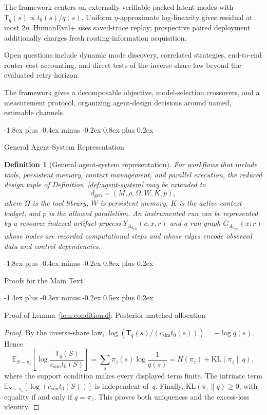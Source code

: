 \documentclass[10pt,twocolumn]{article}
\makeatletter
\theoremstyle{paperplain}
\theoremstyle{paperdefinition}
\newtheorem{definition}[theorem]{Definition}
\theoremstyle{paperremark}
\renewcommand{\section}{%
  \@startsection{section}{1}{\z@}%
    {-1.8ex plus -0.4ex minus -0.2ex}%
    {0.8ex plus 0.2ex}%
    {\normalfont\large\bfseries\raggedright}}
\renewcommand{\subsection}{%
  \@startsection{subsection}{2}{\z@}%
    {-1.4ex plus -0.3ex minus -0.2ex}%
    {0.5ex plus 0.2ex}%
    {\normalfont\normalsize\bfseries\raggedright}}
\newcommand{\KL}{\mathrm{KL}}
\newcommand{\E}{\mathbb{E}}
\makeatother
\begin{document}
The framework centers on externally verifiable packed latent modes with
$\mathsf{T}_q(s)\propto t_0(s)/q(s)$.  Uniform $\eta$-approximate
log-linearity gives residual at most $2\eta$.  HumanEval+ uses saved-trace
replay; prospective paired deployment additionally charges fresh
routing-information acquisition.

Open questions include dynamic mode discovery, correlated strategies,
end-to-end router-cost accounting, and direct tests of the inverse-share law
beyond the evaluated retry horizon.

The framework gives a decomposable objective, model-selection crossovers, and a
measurement protocol, organizing agent-design decisions around named,
estimable channels.

\onecolumn
\appendix

\section{General Agent-System Representation}
\label{app:general-agent-system}

\begin{definition}[General agent-system representation]
For workflows that include tools, persistent memory, context management, and
parallel execution, the reduced design tuple of Definition~\ref{def:agent-system}
may be extended to
\[
d_{\mathrm{gen}}=(M,\rho,\Omega,W,K,p),
\]
where $\Omega$ is the tool library, $W$ is persistent memory, $K$ is the active
context budget, and $p$ is the allowed parallelism.  An instrumented run can be
represented by a resource-indexed artifact process $Y_{A_{d_{\mathrm{gen}}}}(c;x,r)$ and a run
graph $G_{A_{d_{\mathrm{gen}}}}(x;r)$ whose nodes are recorded computational steps and whose
edges encode observed data and control dependencies.
\end{definition}

\section{Proofs for the Main Text}
\label{app:main-proofs}

\subsection{Proof of Lemma~\ref{lem:conditional}: Posterior-matched allocation}
\label{app:proof:lem:conditional}

\begin{proof}
By the inverse-share law,
$\log(\mathsf T_q(s)/(c_{\mathrm{sim}}t_0(s)))=-\log q(s)$.  Hence
\[
\E_{S\sim\pi_z}\!\left[
\log\frac{\mathsf T_q(S)}{c_{\mathrm{sim}}t_0(S)}
\right]
=\sum_s\pi_z(s)\log\frac{1}{q(s)}
=H(\pi_z)+\KL(\pi_z\|q),
\]
where the support condition makes every displayed term finite.  The intrinsic
term $\E_{S\sim\pi_z}[\log(c_{\mathrm{sim}}t_0(S))]$ is independent of~$q$.
Finally, $\KL(\pi_z\|q)\ge0$, with equality if and only if $q=\pi_z$.
This proves both uniqueness and the excess-loss identity.
\end{proof}
\end{document}
